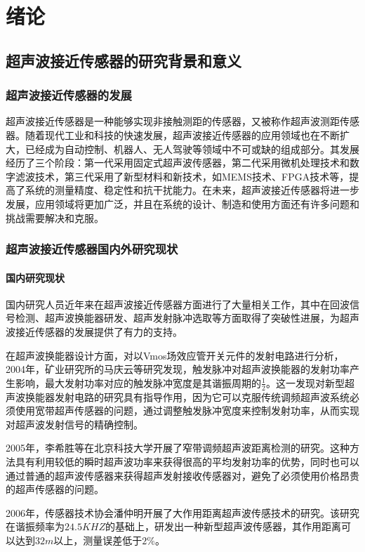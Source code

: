 	\newpage
	\section{绪论}
    \subsection{超声波接近传感器的研究背景和意义}
    \subsubsection{超声波接近传感器的发展}
    超声波接近传感器是一种能够实现非接触测距的传感器，又被称作超声波测距传感器。随着现代工业和科技的快速发展，超声波接近传感器的应用领域也在不断扩大，已经成为自动控制、机器人、无人驾驶等领域中不可或缺的组成部分。其发展经历了三个阶段：第一代采用固定式超声波传感器，第二代采用微机处理技术和数字滤波技术，第三代采用了新型材料和新技术，如MEMS技术、FPGA技术等，提高了系统的测量精度、稳定性和抗干扰能力。在未来，超声波接近传感器将进一步发展，应用领域将更加广泛，并且在系统的设计、制造和使用方面还有许多问题和挑战需要解决和克服。
    \subsubsection{超声波接近传感器国内外研究现状}
    \paragraph{国内研究现状}
	国内研究人员近年来在超声波接近传感器方面进行了大量相关工作，其中在回波信号检测、超声波换能器研发、超声发射脉冲选取等方面取得了突破性进展，为超声波接近传感器的发展提供了有力的支持。
	
	在超声波换能器设计方面，对以Vmos场效应管开关元件的发射电路进行分析，2004年，矿业研究所的马庆云等研究发现，触发脉冲对超声波换能器的发射功率产生影响，最大发射功率对应的触发脉冲宽度是其谐振周期的$\frac{1}{2}$。这一发现对新型超声波换能器发射电路的研究具有指导作用，因为它可以克服传统调频超声波系统必须使用宽带超声传感器的问题，通过调整触发脉冲宽度来控制发射功率，从而实现对超声波发射信号的精确控制。
	
	2005年，李希胜等在北京科技大学开展了窄带调频超声波距离检测的研究。这种方法具有利用较低的瞬时超声波功率来获得很高的平均发射功率的优势，同时也可以通过普通的超声波传感器来获得超声发射接收传感器对，避免了必须使用价格昂贵的超声传感器的问题。
	
	2006年，传感器技术协会潘仲明开展了大作用距离超声波传感技术的研究。该研究在谐振频率为$24.5KHZ$的基础上，研发出一种新型超声波传感器，其作用距离可以达到$32m$以上，测量误差低于$2\%$。
	
